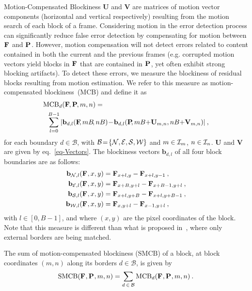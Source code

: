 \documentclass{article}
\begin{document}
\begin{section}{Motion-Compensated Blockiness}
$\mathbf{U}$ and $\mathbf{V}$ are matrices of motion vector components
(horizontal and vertical respectively) resulting from the motion search of
each block of a frame. Considering motion in the error detection process 
can significantly reduce false error detection by compensating for motion between $\mathbf{F}_{}$ and $\mathbf{P}_{}$.
However, motion compensation will not detect errors related to content
contained in both the current and the previous frames (e.g. corrupted
motion vectors yield blocks in $\mathbf{F}_{}$ that are contained in $\mathbf{P}_{}$, yet
often exhibit strong blocking artifacts). To detect these errors, we
measure the blockiness of residual blocks resulting from motion estimation.
We refer to this measure as motion-compensated blockiness~(MCB) and define
it as
\begin{equation*}
\begin{split}
\textrm{M}&\textrm{CB}_{d}(\ltF{\!},\ltP{\!}, m,n)=\\&\!\!\sum_{l = 0}^{B-1} | \ltCB{d,l}{\ltF{\!\!},m B\!,n
B}\!-\!\ltCB{d, l}{\ltP{\!\!},m B{\scriptsize +}\mathbf{U}_{m, n}, n
B{\scriptsize +}\mathbf{V}_{m, n}} |\:,
\end{split}
\end{equation*}
\noindent{}for each boundary $d \in \mathcal{B}$, with 
\mbox{$\mathcal{B}\!=\!\{\mathcal{N}, \mathcal{E}, \mathcal{S}, \mathcal{W}\}$} and
\mbox{$m \in \mathcal{I}_{m}$}, \mbox{$n \in \mathcal{I}_{n}$}. $\mathbf{U}$
and $\mathbf{V}$ are given by eq.~\eqref{eq-Vectors}. The blockiness vectors
$\mathbf{b}_{d, l}$ of all four block boundaries are as follows:
\begin{align*}
\mathbf{b}_{\mathcal{N}, l}(\mathbf{F}_{}, x,y) &= \mathbf{F}_{x+l,y} - \mathbf{F}_{x+l,y-1}\:, \\
\mathbf{b}_{\mathcal{E}, l}(\mathbf{F}_{}, x,y) &= \mathbf{F}_{x+B,y+l} - \mathbf{F}_{x+B-1,y+l}\:, \\
\mathbf{b}_{\mathcal{S}, l}(\mathbf{F}_{}, x,y) &= \mathbf{F}_{x+l,y+B} - \mathbf{F}_{x+l,y+B-1}\:, \\
\mathbf{b}_{\mathcal{W}, l}(\mathbf{F}_{}, x,y) &= \mathbf{F}_{x,y+l} - \mathbf{F}_{x-1,y+l}\:,
\end{align*}
with $l \in [0, B-1]$, and where $(x,y)$ are the pixel coordinates of the block.
Note that this measure is different than what is proposed in~\cite{OBMA}, where
only external borders are being matched.

The sum of motion-compensated blockiness ($\textrm{SMCB}$) of a block, at block
coordinates $(m,n)$ along its borders $d \in \mathcal{B}$, is given by
\begin{equation*}
\label{eq-SumTB}
\textrm{SMCB}(\mathbf{F}_{},\mathbf{P}_{}, m,n) =
\sum_{d\:\in\:\mathcal{B}}\textrm{MCB}_{d}(\mathbf{F}_{},\mathbf{P}_{},m,n)\:.
\end{equation*}


\end{section}
\end{document}
